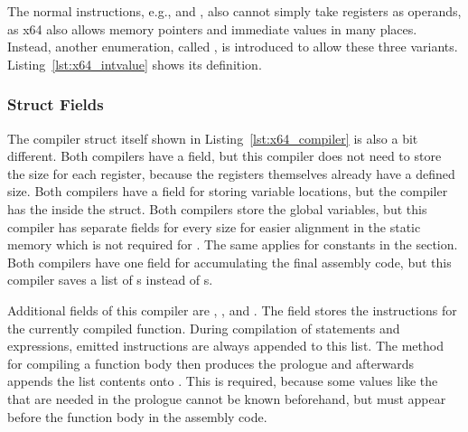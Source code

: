 The normal instructions, e.g.,  and , also cannot simply take registers as operands, as x64 also allows memory pointers and immediate values in many places.
Instead, another enumeration, called , is introduced to allow these three variants.
Listing~\ref{lst:x64_intvalue} shows its definition.

\subsubsection{Struct Fields}


The compiler struct itself shown in Listing~\ref{lst:x64_compiler} is also a bit different.
Both compilers have a  field, but this compiler does not need to store the size for each register, because the registers themselves already have a defined size.
Both compilers have a  field for storing variable locations, but the \riscv{} compiler has the  inside the  struct.
Both compilers store the global variables, but this compiler has separate fields for every size for easier alignment in the static memory which is not required for \riscv{}.
The same applies for constants in the  section.
Both compilers have one field for accumulating the final assembly code, but this compiler saves a list of s instead of s.


Additional fields of this compiler are , , and .
The  field stores the instructions for the currently compiled function.
During compilation of statements and expressions, emitted instructions are always appended to this list.
The method for compiling a function body then produces the prologue and afterwards appends the list contents onto .
This is required, because some values like the  that are needed in the prologue cannot be known beforehand, but must appear before the function body in the assembly code.

